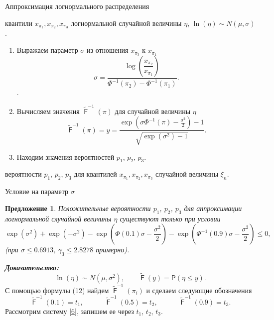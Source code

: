 \documentclass[ucs, notheorems, handout]{beamer}
\newtheorem{proposition}[theorem]{Предложение}
\newenvironment{pr1}{\par\noindent{\bf Дано:}}{}
\newenvironment{pr2}{\par\noindent{\bf Шаги:}}{}
\newenvironment{pr3}{\par\noindent{\bf Результат:}}{}
\DeclareMathOperator{\F}{\mathsf{F}}
\begin{document}
\begin{frame}{Аппроксимация логнормального распределения}
		\begin{pr1}
			квантили $x_{\pi_{1}}, x_{\pi_{2}}, x_{\pi_{3}}$ логнормальной случайной величины $\eta$, $\ln(\eta) \sim N(\mu, \sigma)$.
		\end{pr1}
		
		\begin{pr2}\end{pr2}
		\begin{enumerate}
			\item Выражаем параметр $\sigma$ из отношения $x_{\pi_{3}}$ к $x_{\pi_{1}}$
			 \begin{equation*}
				\displaystyle{\sigma = \dfrac{\log\left(\dfrac{x_{\pi_{2}}}{x_{\pi_{1}}}\right)}{\Phi ^{-1}(\pi_{2}) - \Phi ^{-1}(\pi_{1})}}.
			\end{equation*}.
			\item Вычисляем значения $\tilde{\F}^{-1}(\pi)$ для случайной величины $\eta$
			\begin{equation*}
				\displaystyle{\tilde{\F}^{-1}(\pi) = y = \frac{\exp(\sigma\Phi^{-1}(\pi) - \frac{\sigma^{2} }{2})-1}{\sqrt{\exp(\sigma ^{2})-1}}}.
			\end{equation*}
			\item Находим значения вероятностей $p_{1}$, $p_{2}$, $p_{3}$.
		\end{enumerate}
		\begin{pr3}\end{pr3} вероятности $p_{1}$, $p_{2}$, $p_{3}$ для квантилей $x_{\pi_{1}}, x_{\pi_{2}}, x_{\pi_{3}}$ случайной величины $\xi_{n}$.
	
\end{frame}

\begin{frame}{Условие на параметр $\sigma$}
		\begin{proposition}
		Положительные вероятности $p_{1}$, $p_{2}$, $p_{3}$ для аппроксимации логнормальной случайной величины $\eta$ существуют только при условии \[\exp(\sigma^{2})+\exp(-\sigma^{2})-\exp(\Phi(0.1)\sigma-\dfrac{\sigma^{2}}{2})-\exp(\Phi^{-1}(0.9)\sigma-\dfrac{\sigma^{2}}{2})\leq 0,\] (при $\sigma\leq 0.6913$, $\gamma_{3}\leq 2.8278$ примерно).
	\end{proposition}
\textbf{\textit{Доказательство:}}
\begin{equation*}
	\ln(\eta) \sim N(\mu, \sigma^{2}), \quad\quad \tilde{\F}(y) = \mathsf{P}\left(\eta\leq y \right).
\end{equation*}
С помощью формулы (12) найдем $\displaystyle{\tilde{\F}^{-1}(\pi_{i})}$ и сделаем следующие обозначения
\[\tilde{\F}^{-1}(0.1) = t_{1}, \quad\quad\quad \tilde{\F}^{-1}(0.5) = t_{2}, \quad\quad\quad \tilde{\F}^{-1}(0.9) = t_{3}.\]
Рассмотрим систему \eqref{6}, запишем ее через $t_{1}$, $t_{2}$, $t_{3}$. 
\end{frame}
\end{document}
